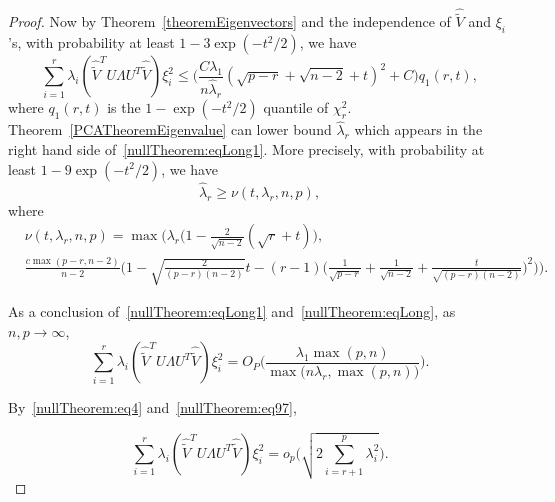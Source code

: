 \begin{proof}
Now by Theorem~\ref{theoremEigenvectors} and the independence of $\hat{\tilde{V}}$ and $\xi_i$'s, with probability at least $1-3\exp(-t^2/2)$, we have
    \begin{equation}\label{nullTheorem:eqLong1}
    \sum_{i=1}^{r} \lambda_i (\hat{\tilde{V}}^T U \Lambda U^T \hat{\tilde{V}}) \xi_i^2
    \leq
\big(\frac{C\lambda_1}{n\hat{\lambda}_r}(\sqrt{p-r}+\sqrt{n-2}+t)^2+C\big) q_1(r,t)
,
    \end{equation}
     where $q_1(r,t)$ is the $1-\exp(-t^2/2)$ quantile of $\chi^2_r$.
 Theorem~\ref{PCATheoremEigenvalue} can lower bound $\hat{\lambda}_r$ which appears in the right hand side of~\eqref{nullTheorem:eqLong1}.
 More precisely,
with probability at least $1-9\exp(-t^2/2)$, we have
    \begin{equation}\label{nullTheorem:eqLong}
            {\hat{\lambda}_r}\geq 
            \nu(t,\lambda_r,n,p),
    \end{equation}
 where
\begin{equation*}
        \begin{split}
            &\nu(t,\lambda_r,n,p)=
            \max \Big(\lambda_r\big(1-\frac{2}{\sqrt{n-2}}(\sqrt{r}+t)\big),\\
            &\frac{c\max(p-r,n-2)}{n-2} \big( 1-\sqrt{\frac{2}{(p-r)(n-2)}}t-
            (r-1)\big(\frac{1}{\sqrt{p-r}}+\frac{1}{\sqrt{n-2}}+\frac{t}{\sqrt{(p-r)(n-2)}}\big)^2 \big) \Big).
        \end{split}
    \end{equation*}



As a conclusion of~\eqref{nullTheorem:eqLong1} and~\eqref{nullTheorem:eqLong}, as $n,p \to \infty$, 
\begin{equation}\label{nullTheorem:eq97}
    \sum_{i=1}^{r} \lambda_i (\hat{\tilde{V}}^T U \Lambda U^T \hat{\tilde{V}}) \xi_i^2
    =
O_P\Big(\frac{\lambda_1\max(p,n)}{\max\big(n\lambda_r,\max(p,n)\big)}\Big).
\end{equation}

By~\eqref{nullTheorem:eq4} and~\eqref{nullTheorem:eq97}, 

\begin{equation}\label{nullTheorem:eq3}
\sum_{i=1}^{r} \lambda_i (\hat{\tilde{V}}^T U \Lambda U^T \hat{\tilde{V}}) \xi_i^2
=o_p\Big(\sqrt{2\sum_{i=r+1}^p \lambda_i^2}\Big).
\end{equation}



\end{proof}
